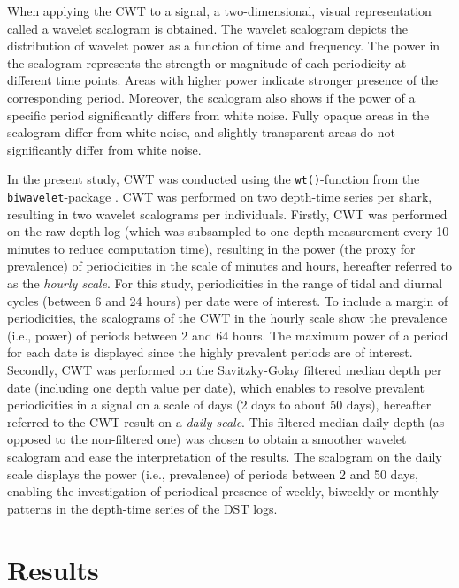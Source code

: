 \documentclass[
  authoryear,
  review,
  3p]{elsarticle}
\begin{document}
When applying the CWT to a signal, a two-dimensional, visual
representation called a wavelet scalogram is obtained. The wavelet
scalogram depicts the distribution of wavelet power as a function of
time and frequency. The power in the scalogram represents the strength
or magnitude of each periodicity at different time points. Areas with
higher power indicate stronger presence of the corresponding period.
Moreover, the scalogram also shows if the power of a specific period
significantly differs from white noise. Fully opaque areas in the
scalogram differ from white noise, and slightly transparent areas do not
significantly differ from white noise.

In the present study, CWT was conducted using the \texttt{wt()}-function
from the \texttt{biwavelet}-package \citep{biwavelet}. CWT was performed
on two depth-time series per shark, resulting in two wavelet scalograms
per individuals. Firstly, CWT was performed on the raw depth log (which
was subsampled to one depth measurement every 10 minutes to reduce
computation time), resulting in the power (the proxy for prevalence) of
periodicities in the scale of minutes and hours, hereafter referred to
as the \emph{hourly scale}. For this study, periodicities in the range
of tidal and diurnal cycles (between 6 and 24 hours) per date were of
interest. To include a margin of periodicities, the scalograms of the
CWT in the hourly scale show the prevalence (i.e., power) of periods
between 2 and 64 hours. The maximum power of a period for each date is
displayed since the highly prevalent periods are of interest. Secondly,
CWT was performed on the Savitzky-Golay filtered median depth per date
(including one depth value per date), which enables to resolve prevalent
periodicities in a signal on a scale of days (2 days to about 50 days),
hereafter referred to the CWT result on a \emph{daily scale}. This
filtered median daily depth (as opposed to the non-filtered one) was
chosen to obtain a smoother wavelet scalogram and ease the
interpretation of the results. The scalogram on the daily scale displays
the power (i.e., prevalence) of periods between 2 and 50 days, enabling
the investigation of periodical presence of weekly, biweekly or monthly
patterns in the depth-time series of the DST logs.

\newpage{}

\hypertarget{sec-results}{%
\section{Results}\label{sec-results}}
\end{document}
